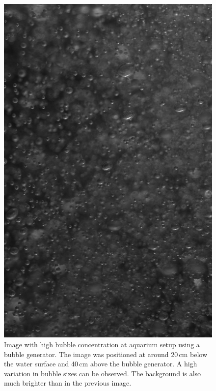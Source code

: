\begin{figure}
	\centering
	\includegraphics[scale=0.3]{images/aquarium_result_high_conc.jpg}
	\caption{Image with high bubble concentration at aquarium setup using a bubble generator. The image was positioned at around 20\,cm below the water surface and 40\,cm above the bubble generator. A high variation in bubble sizes can be observed. The background is also much brighter than in the previous image. }
\end{figure}


